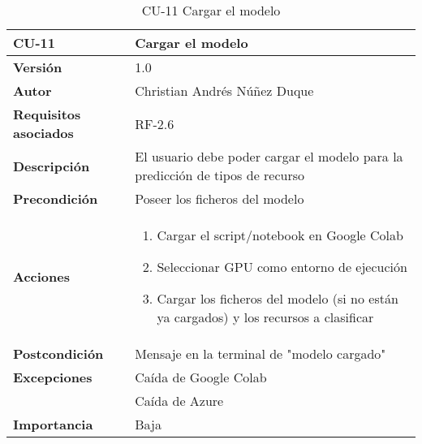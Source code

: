 \begin{table}[p]
	\centering
	\begin{tabularx}{\linewidth}{ p{} p{} }
		\toprule
		\textbf{CU-11}    & \textbf{Cargar el modelo}\\
		\toprule
		\textbf{Versión}              & 1.0    \\
		\textbf{Autor}                & Christian Andrés Núñez Duque \\
		\textbf{Requisitos asociados} & RF-2.6 \\
		\textbf{Descripción}          & El usuario debe poder cargar el modelo para la predicción de tipos de recurso \\
		\textbf{Precondición}         & Poseer los ficheros del modelo \\
		\textbf{Acciones}             &
		\begin{enumerate}
			\def\labelenumi{\arabic{enumi}.}
			\tightlist
			\item Cargar el script/notebook en Google Colab
			\item Seleccionar GPU como entorno de ejecución
			\item Cargar los ficheros del modelo (si no están ya cargados) y los recursos a clasificar
		\end{enumerate}\\
		\textbf{Postcondición}        & Mensaje en la terminal de "modelo cargado" \\
		\textbf{Excepciones}          & Caída de Google Colab \\ & Caída de Azure \\
		\textbf{Importancia}          & Baja \\
		\bottomrule
	\end{tabularx}
	\caption{CU-11 Cargar el modelo}
\end{table}

